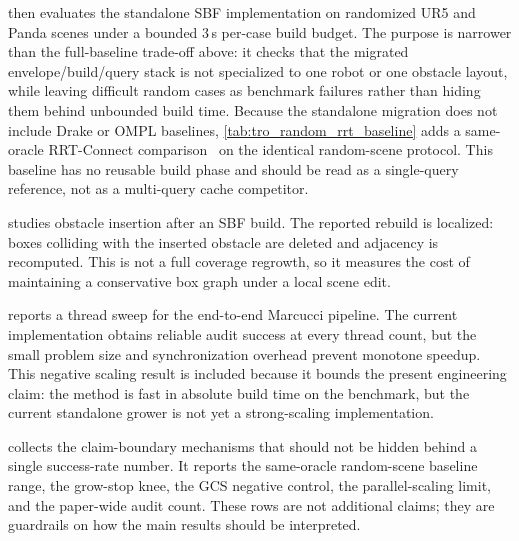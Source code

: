 

 then evaluates the standalone SBF implementation on randomized UR5 and Panda scenes under a bounded 3\,s per-case build budget. The purpose is narrower than the full-baseline trade-off above: it checks that the migrated envelope/build/query stack is not specialized to one robot or one obstacle layout, while leaving difficult random cases as benchmark failures rather than hiding them behind unbounded build time. Because the standalone migration does not include Drake or OMPL baselines, \cref{tab:tro_random_rrt_baseline} adds a same-oracle RRT-Connect comparison~\cite{kuffner2000rrt} on the identical random-scene protocol. This baseline has no reusable build phase and should be read as a single-query reference, not as a multi-query cache competitor.




 studies obstacle insertion after an SBF build. The reported rebuild is localized: boxes colliding with the inserted obstacle are deleted and adjacency is recomputed. This is not a full coverage regrowth, so it measures the cost of maintaining a conservative box graph under a local scene edit.



 reports a thread sweep for the end-to-end Marcucci pipeline. The current implementation obtains reliable audit success at every thread count, but the small problem size and synchronization overhead prevent monotone speedup. This negative scaling result is included because it bounds the present engineering claim: the method is fast in absolute build time on the benchmark, but the current standalone grower is not yet a strong-scaling implementation.



 collects the claim-boundary mechanisms that should not be hidden behind a single success-rate number. It reports the same-oracle random-scene baseline range, the grow-stop knee, the GCS negative control, the parallel-scaling limit, and the paper-wide audit count. These rows are not additional claims; they are guardrails on how the main results should be interpreted.




